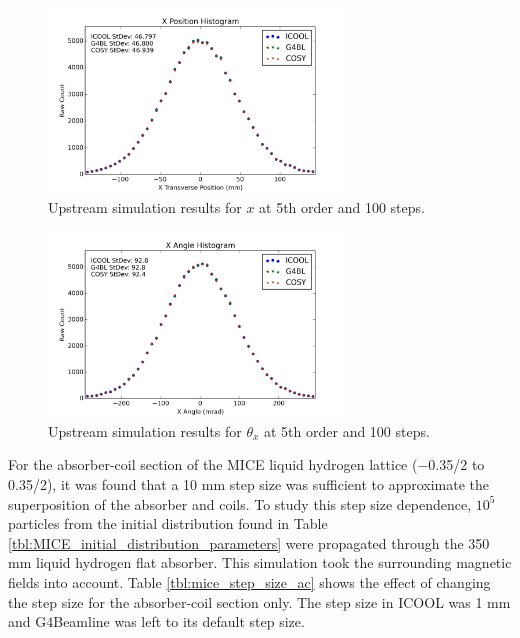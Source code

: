 \begin{figure}[H]
  \centering
    \includegraphics[width=0.7\textwidth]{MICE data/upstream/x} 
  \caption{Upstream simulation results for $x$ at 5th order and 100 steps.}
  \label{fig:upx}
\end{figure}

\begin{figure}[H]
  \centering
    \includegraphics[width=0.7\textwidth]{MICE data/upstream/px} 
  \caption{Upstream simulation results for $\theta_x$ at 5th order and 100 steps.}
  \label{fig:uppx}
\end{figure}

For the absorber-coil section of the MICE liquid hydrogen lattice ($-$0.35/2 to 0.35/2), it was found that a 10 mm step size was sufficient to approximate the superposition of the absorber and coils. To study this step size dependence, $10^5$ particles from the initial distribution found in Table \ref{tbl:MICE_initial_distribution_parameters} were propagated through the 350 mm liquid hydrogen flat absorber. This simulation took the surrounding magnetic fields into account. Table \ref{tbl:mice_step_size_ac} shows the effect of changing the step size for the absorber-coil section only. The step size in ICOOL was 1 mm and G4Beamline was left to its default step size.

